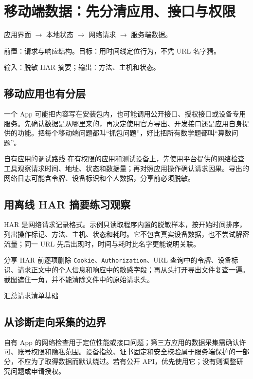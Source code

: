 \chapter{移动端数据：先分清应用、接口与权限}\label{ch:mobile}
\begin{tcolorbox}[title=章首知识地图,colframe=Ink]
应用界面 $\longrightarrow$ 本地状态 $\longrightarrow$ 网络请求 $\longrightarrow$ 服务端数据。
\end{tcolorbox}

\begin{tcolorbox}[title=学习目标与前置知识,colframe=Ink!65,colback=Ink!2]
前置：请求与响应结构。目标：用时间线定位行为，不凭 URL 名字猜。\par
输入：脱敏 HAR 摘要；输出：方法、主机和状态。
\end{tcolorbox}

\section{移动应用也有分层}
一个 App 可能把内容写在安装包内，也可能调用公开接口、授权接口或设备专用服务。先确认数据是从哪里来的，再决定使用官方导出、开发接口还是应用自身提供的功能。把每个移动端问题都叫“抓包问题”，好比把所有数学题都叫“算数问题”。

\begin{method}{自有应用的调试路线}
在有权限的应用和测试设备上，先使用平台提供的网络检查工具观察请求时间、地址、状态和数据量；再对照应用操作确认请求因果。导出的网络日志可能含令牌、设备标识和个人数据，分享前必须脱敏。
\end{method}

\section{用离线 HAR 摘要练习观察}
HAR 是网络请求记录格式。示例只读取程序内置的脱敏样本，按开始时间排序，列出操作标记、方法、主机、状态和耗时。它不包含真实设备数据，也不尝试解密流量；同一 URL 先后出现时，时间与耗时比名字更能说明关联。

分享 HAR 前逐项删除 \texttt{Cookie}、\texttt{Authorization}、URL 查询中的令牌、设备标识、请求正文中的个人信息和响应中的敏感字段；再从头打开导出文件复查一遍。截图遮住一角，并不能清除文件中的原始请求头。

\begin{example}{汇总请求清单}{基础}
\end{example}

\section{从诊断走向采集的边界}
自有 App 的网络检查用于定位性能或接口问题；第三方应用的数据采集需确认许可、账号权限和隐私范围。设备指纹、证书固定和安全校验属于服务端保护的一部分，不应为了取得数据而默认绕过。若有公开 API，优先使用它；没有则调整研究问题或申请授权。

